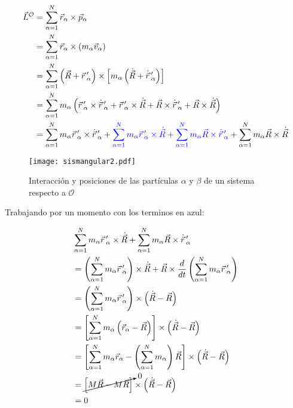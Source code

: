 \documentclass[/home/hernan/Documentos/Apuntes_mecanica_teorica/main.tex]{subfiles}
\begin{document}
	\begin{align*}
		\vec{L}^{\mathcal{O}} &= \sum_{\alpha = 1}^{N} \vec{r}_{\alpha} \times \vec{p}_{\alpha} \\ 
							& = \sum_{\alpha = 1}^{N} \vec{r}_{\alpha} \times \left(m_{\alpha} \vec{v}_{\alpha} \right) \\ 
							& = \sum_{\alpha = 1}^{N} \left(\vec{R} + {\vec{r}}\,'_{\alpha} \right) \times \left[m_{\alpha} \left(\dot{\vec{R}} + {\dot{\vec{r}}}\,'_{\alpha} \right) \right] \\ 
							& = \sum_{\alpha =1}^{N} m_{\alpha} \left({\vec{r}}\,'_{\alpha} \times {\dot{\vec{r}}}\,'_{\alpha} + {\vec{r}}\,'_{\alpha} \times \dot{\vec{R}} + \vec{R} \times {\dot{\vec{r}}}\,'_{\alpha} + \vec{R} \times \dot{\vec{R}} \right) \\ 
							& =  \sum_{\alpha =1}^{N} m_{\alpha} {\vec{r}}\,'_{\alpha} \times {\dot{\vec{r}}}\,'_{\alpha} + \textcolor{blue}{\sum_{\alpha =1}^{N} m_{\alpha} {\vec{r}}\,'_{\alpha} \times \dot{\vec{R}} + \sum_{\alpha =1}^{N} m_{\alpha} \vec{R} \times {\dot{\vec{r}}}\,'_{\alpha}} + \sum_{\alpha =1}^{N} m_{\alpha}  \vec{R} \times \dot{\vec{R}}
	\end{align*}


	\begin{marginfigure}
		\begin{figure}[H]
			\texttt{[image: sismangular2.pdf]}
			\caption{Interacción y posiciones de las partículas $\alpha$ y $\beta$ de un sistema respecto a $\mathcal{O}$ }
			\label{fig: sismangular2}
		\end{figure}
	\end{marginfigure}

	Trabajando por un momento con los terminos en azul:

	\begin{align*}
		& \sum_{\alpha =1}^{N} m_{\alpha} {\vec{r}}\,'_{\alpha} \times \dot{\vec{R}} + \sum_{\alpha =1}^{N} m_{\alpha} \vec{R} \times {\dot{\vec{r}}}\,'_{\alpha} \\ 
		& = \left( \sum_{\alpha =1}^{N} m_{\alpha} {\vec{r}}\,'_{\alpha} \right) \times \dot{\vec{R}} + \vec{R} \times \frac{d}{dt} \left( \sum_{\alpha =1}^{N} m_{\alpha} {\vec{r}}\,'_{\alpha} \right) \\ 
		& = \left( \sum_{\alpha =1}^{N} m_{\alpha} {\vec{r}}\,'_{\alpha} \right) \times \left( \dot{\vec{R}}  - \vec{R}\right) \\ 
		& = \left[ \sum_{\alpha =1}^{N} m_{\alpha} \left(\vec{r}_{\alpha} - \vec{R} \right) \right] \times \left( \dot{\vec{R}}  - \vec{R}\right) \\ 
		& = \left[ \sum_{\alpha =1}^{N} m_{\alpha} \vec{r}_{\alpha} -\left( \sum_{\alpha =1}^{N} m_{\alpha} \right) \vec{R} \right] \times \left( \dot{\vec{R}}  - \vec{R}\right) \\ 
		& = \cancelto{0}{\left[M\vec{R}-M\vec{R}\right]} \times \left( \dot{\vec{R}}  - \vec{R}\right) \\ 
		& = 0
	\end{align*}
\end{document}

